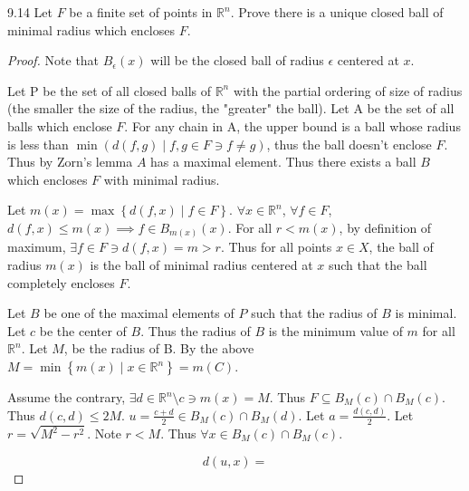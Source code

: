 \documentclass{article}
\newcommand*{\subeq}{\subseteq}
\newcommand{\R}{\mathbb{R}}
\begin{document}
\begin{claim}{9.14}\label{Claim 9.14.}
    Let $F$ be a finite set of points in $\R^n$. Prove there is a unique closed ball of minimal radius which encloses $F$.    
\end{claim}
\begin{proof}
    Note that $B_\epsilon(x)$ will be the closed ball of radius $\epsilon$ centered at $x$. 
    
    
    Let P be the set of all closed balls of $\R^n$ with the partial ordering of size of radius (the smaller the size of the radius, the "greater" the ball). Let A be the set of all balls which enclose $F$. For any chain in A, the upper bound is a ball whose radius is less than $\min(d(f, g) \mid f, g \in F \ni f \neq g)$, thus the ball doesn't enclose $F$. Thus by Zorn's lemma $A$ has a maximal element. Thus there exists a ball $B$ which encloses $F$ with minimal radius. 
    
    Let $m(x) = \max\left\{ d(f, x) \mid f \in F \right\}$. $\forall x \in \R^n$, $\forall f \in F$, $d(f, x) \leq m(x) \implies f \in B_{m(x)}(x)$. For all $r < m(x)$, by definition of maximum, $\exists f\in F \ni d(f, x) = m > r$. Thus for all points $x \in X$, the ball of radius $m(x)$ is the ball of minimal radius centered at $x$ such that the ball completely encloses $F$.              

    Let $B$ be one of the maximal elements of $P$ such that the radius of $B$ is minimal. Let $c$ be the center of $B$. Thus the radius of $B$ is the minimum value of $m$ for all $\R^n$. Let $M$, be the radius of B. By the above $M = \min\left\{ m(x) \mid x \in \R^n \right\} = m(C)$. 
    
    Assume the contrary, $\exists d \in \R^n \setminus c \ni m(x) = M$. Thus $F \subeq B_M(c) \cap B_M(c)$. Thus $d(c, d) \leq 2M$. $u = \frac{c + d}{2} \in B_M(c) \cap B_M(d)$. Let $a = \frac{d(c,d)}{2}$. Let $r = \sqrt{M^2 - r^2}$. Note $r < M$.  Thus $\forall x \in B_M(c) \cap B_M(c)$. 
    
    \[
    d(u, x) = 
    \] 
\end{proof}

\bigskip
\end{document}
